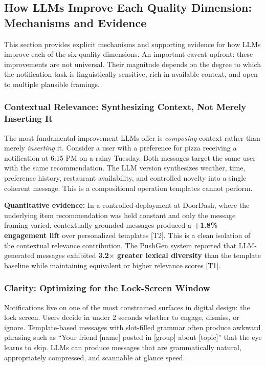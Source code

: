 \documentclass[11pt]{article}
\begin{document}
\subsection{How LLMs Improve Each Quality Dimension: Mechanisms and Evidence}

This section provides explicit mechanisms and supporting evidence for how LLMs improve each of the six quality dimensions. An important caveat upfront: these improvements are not universal. Their magnitude depends on the degree to which the notification task is linguistically sensitive, rich in available context, and open to multiple plausible framings.

\subsubsection{Contextual Relevance: Synthesizing Context, Not Merely Inserting It}

The most fundamental improvement LLMs offer is \textit{composing} context rather than merely \textit{inserting} it. Consider a user with a preference for pizza receiving a notification at 6:15 PM on a rainy Tuesday. Both messages target the same user with the same recommendation. The LLM version synthesizes weather, time, preference history, restaurant availability, and controlled novelty into a single coherent message. This is a compositional operation templates cannot perform.

\textbf{Quantitative evidence:} In a controlled deployment at DoorDash, where the underlying item recommendation was held constant and only the message framing varied, contextually grounded messages produced a \textbf{+1.8\% engagement lift} over personalized templates \citep{sinha2024doordash} [T2]. This is a clean isolation of the contextual relevance contribution. The PushGen system reported that LLM-generated messages exhibited \textbf{3.2$\times$ greater lexical diversity} than the template baseline while maintaining equivalent or higher relevance scores \citep{bie2026pushgen} [T1].

\subsubsection{Clarity: Optimizing for the Lock-Screen Window}

Notifications live on one of the most constrained surfaces in digital design: the lock screen. Users decide in under 2 seconds whether to engage, dismiss, or ignore. Template-based messages with slot-filled grammar often produce awkward phrasing such as ``Your friend [name] posted in [group] about [topic]'' that the eye learns to skip. LLMs can produce messages that are grammatically natural, appropriately compressed, and scannable at glance speed.
\end{document}
